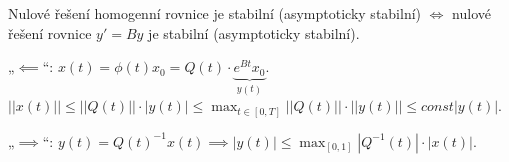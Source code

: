 \documentclass[12pt]{article}					%
\begin{document}
\begin{dusledek}
	Nulové řešení homogenní rovnice je stabilní (asymptoticky stabilní) $\Leftrightarrow$ nulové řešení rovnice $y' = By$ je stabilní (asymptoticky stabilní).

	\begin{dukazin}
		„$\impliedby$“: $x(t) = \phi(t) x_0 = Q(t)·\underbrace{e^{Bt}x_0}_{y(t)}$. $||x(t)|| ≤ ||Q(t)||·|y(t)| ≤ \max_{t \in [0, T]}||Q(t)|| · ||y(t)|| ≤ const |y(t)|$.

		„$\implies$“: $y(t) = Q(t)^{-1} x(t) \implies |y(t)| ≤ \max_{[0, 1]} |Q^{-1}(t)|·|x(t)|$.
	\end{dukazin}
\end{dusledek}
\end{document}
